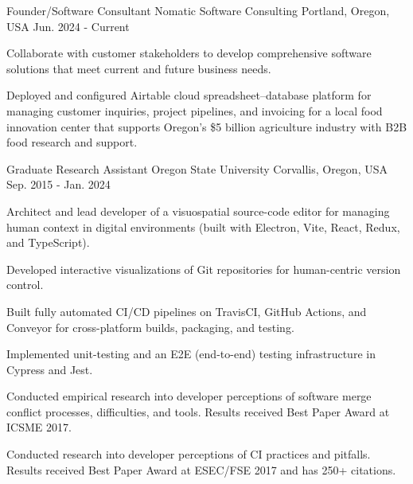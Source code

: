 
\begin{cventries}

\cventry
    {Founder/Software Consultant} %
    {Nomatic Software Consulting} %
    {Portland, Oregon, USA} %
    {Jun. 2024 - Current} %
    {
      \begin{cvitems} %
        \item {Collaborate with customer stakeholders to develop comprehensive software solutions that meet current and future business needs.}
        \item {Deployed and configured Airtable cloud spreadsheet--database platform for managing customer inquiries, project pipelines, and invoicing for a local food innovation center that supports Oregon's \$5 billion agriculture industry with B2B food research and support.}
      \end{cvitems}
    }
    
  \cventry
    {Graduate Research Assistant} %
    {Oregon State University} %
    {Corvallis, Oregon, USA} %
    {Sep. 2015 - Jan. 2024} %
    {
      \begin{cvitems} %
        \item {Architect and lead developer of a visuospatial source-code editor for managing human context in digital environments (built with Electron, Vite, React, Redux, and TypeScript).}
        \item {Developed interactive visualizations of Git repositories for human-centric version control.}
        \item {Built fully automated CI/CD pipelines on TravisCI, GitHub Actions, and Conveyor for cross-platform builds, packaging, and testing.}
        \item {Implemented unit-testing and an E2E (end-to-end) testing infrastructure in Cypress and Jest.}
        \item {Conducted empirical research into developer perceptions of software merge conflict processes, difficulties, and tools. Results received Best Paper Award at ICSME 2017.}
        \item {Conducted research into developer perceptions of CI practices and pitfalls. Results received Best Paper Award at ESEC/FSE 2017 and has 250+ citations.}
      \end{cvitems}
    }


\end{cventries}
